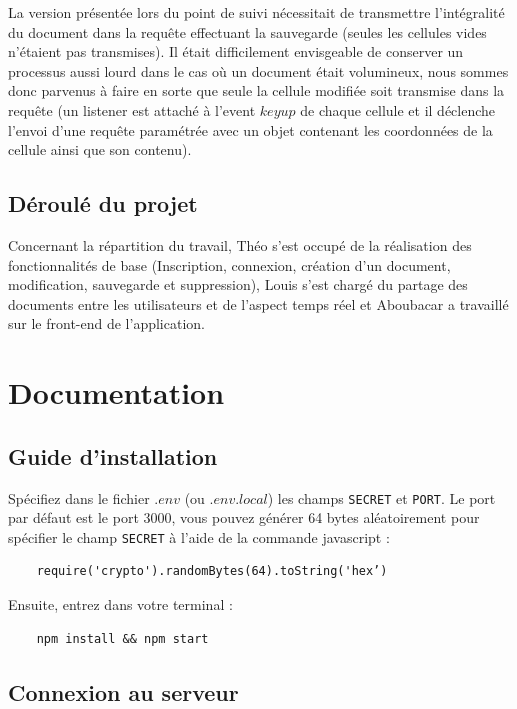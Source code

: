 \documentclass[11pt, letterpaper]{article}
\begin{document}
La version présentée lors du point de suivi nécessitait de transmettre l'intégralité du document dans la requête effectuant la sauvegarde (seules les cellules vides n'étaient pas transmises). Il était difficilement envisgeable de conserver un processus aussi lourd dans le cas où un document était volumineux, nous sommes donc parvenus à faire en sorte que seule la cellule modifiée soit transmise dans la requête (un listener est attaché à l'event $keyup$ de chaque cellule et il déclenche l'envoi d'une requête paramétrée avec un objet contenant les coordonnées de la cellule ainsi que son contenu).

\subsection{Déroulé du projet}

Concernant la répartition du travail, Théo s'est occupé de la réalisation des fonctionnalités de base (Inscription, connexion, création d'un document, modification, sauvegarde et suppression), Louis s'est chargé du partage des documents entre les utilisateurs et de l'aspect temps réel et Aboubacar a travaillé sur le front-end de l'application.

\newpage
\section{Documentation}

\subsection{Guide d'installation}

Spécifiez dans le fichier $.env$ (ou $.env.local$) les champs
\verb+SECRET+ et \verb+PORT+.
Le port par défaut est le port $3000$, vous pouvez générer 64 bytes aléatoirement pour spécifier le champ \verb+SECRET+ à l’aide de la commande javascript :
\begin{verbatim}
    require('crypto').randomBytes(64).toString('hex’)
\end{verbatim}
Ensuite, entrez dans votre terminal :
\begin{verbatim}
    npm install && npm start
\end{verbatim}

\subsection{Connexion au serveur}
\end{document}
